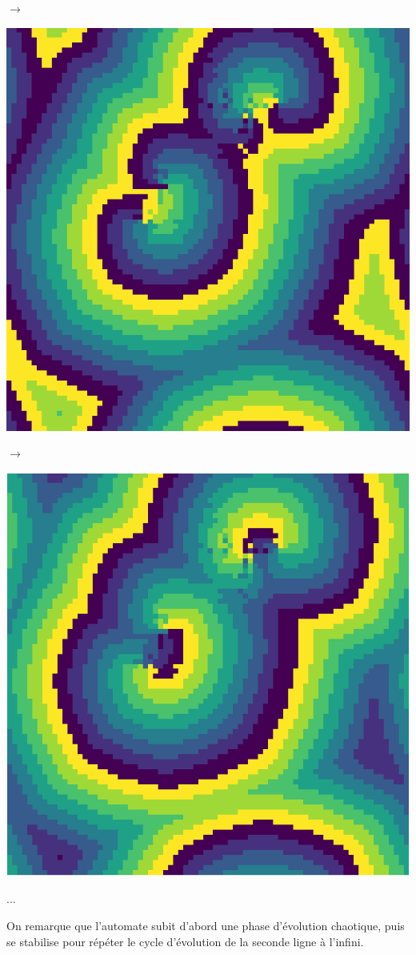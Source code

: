 \documentclass[12pt, a4paper]{article}
\begin{document}
\begin{center}
\begin{minipage}{.17\linewidth}
            \end{minipage}
            $\rightarrow$
            \begin{minipage}{.17\linewidth}
                \includegraphics[scale=0.15]{img/part2/step7.png}
            \end{minipage}
            $\rightarrow$
            \begin{minipage}{.17\linewidth}
                \includegraphics[scale=0.15]{img/part2/step8.png}
            \end{minipage}
            ...
        \end{center}
        On remarque que l'automate subit d'abord une phase d'évolution chaotique, puis se stabilise pour répéter le cycle d'évolution de la seconde ligne à l'infini.
    
\end{document}
